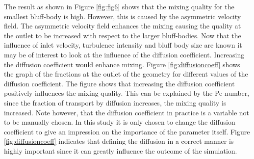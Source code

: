 \documentclass{CFD2017}
\begin{document}
The result as shown in Figure \ref{fig:fig6} shows that the mixing quality for the smallest bluff-body is high. However, this is caused by the asymmetric velocity field. The asymmetric velocity field enhances the mixing causing the quality at the outlet to be increased with respect to the larger bluff-bodies.
\newline
Now that the influence of inlet velocity, turbulence intensity and bluff body size are known it may be of interest to look at the influence of the diffusion coefficient. Increasing the diffusion coefficient would enhance mixing. Figure \ref{fig:diffusioncoeff} shows the graph of the fractions at the outlet of the geometry for different values of the diffusion coefficient. The figure shows that increasing the diffusion coefficient positively influences the mixing quality. This can be explained by the Pe number, since the fraction of transport by diffusion increases, the mixing quality is increased. Note however, that the diffusion coefficient in practice is a variable not to be manually chosen. In this study it is only chosen to change the diffusion coefficient to give an impression on the importance of the parameter itself. Figure \ref{fig:diffusioncoeff} indicates that defining the diffusion in a correct manner is highly important since it can greatly influence the outcome of the simulation.

\newpage

\end{document}
